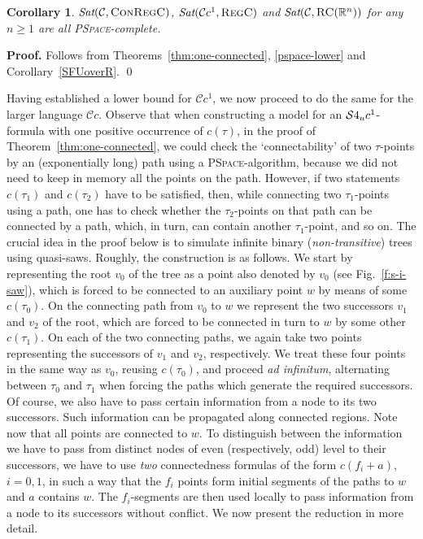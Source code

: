 \documentclass{LMCS}
\renewenvironment{proof}{\par\noindent\textbf{Proof.}}{\mbox{}\qed\par\medskip}
\theoremstyle{plain}
\newtheorem{corollary}[thm]{Corollary}
\newcommand{\cBC}{\ensuremath{\mathcal{C}}}
\newcommand{\cBCc}{\ensuremath{\cBC{}c}} \newcommand{\cBCcc}{\ensuremath{\cBC{}cc}}
\newcommand{\Sat}{\textit{Sat}}
\newcommand{\Regc}{\textsc{RegC}}
\newcommand{\ConR}{\textsc{ConRegC}}
\newcommand{\PSpace}{\textsc{PSpace}}
\begin{document}
\begin{corollary}\label{cor:cBCconPSPACEcomplete}
$\Sat(\cBC,\ConR)$, $\Sat(\cBCc^1,\Regc)$ and $\Sat(\cBC,\RegC(\R^n))$ for any $n\geq 1$ are all \PSpace{}-complete.
\end{corollary}
\begin{proof}
Follows from Theorems~\ref{thm:one-connected}, \ref{pspace-lower} and Corollary~\ref{SFUoverR}.
\end{proof}



Having established a lower bound for $\cBCc{}^1$, we now proceed to do
the same for the larger language $\cBCc$.  Observe that when
constructing a model for an $\mathcal{S}4_u{}c^1$-formula with one positive
occurrence of $c(\tau)$, in the proof of
Theorem~\ref{thm:one-connected}, we could check the `connectability' of two
$\tau$-points by an (exponentially long) path using a
\PSpace{}-algorithm, because we did not need to keep in memory all the
points on the path. However, if two statements $c(\tau_1)$ and
$c(\tau_2)$ have to be satisfied, then, while connecting two
$\tau_1$-points using a path, one has to check whether the
$\tau_2$-points on that path can be connected by a path, which, in
turn, can contain another $\tau_1$-point, and so on.  The crucial idea
in the proof below is to simulate infinite binary
(\emph{non-transitive}) trees using quasi-saws. Roughly, the
construction is as follows.  We start by representing the root $v_{0}$
of the tree as a point also denoted by $v_{0}$ (see
Fig.~\ref{f:s-i-saw}), which is forced to be connected to an auxiliary
point $w$ by means of some $c(\tau_0)$. On the connecting path from
$v_0$ to $w$ we represent the two successors $v_1$ and $v_2$ of the
root, which are forced to be connected in turn to $w$ by some other
$c(\tau_1)$. On each of the two connecting paths, we again take two
points representing the successors of $v_1$ and $v_2$,
respectively. We treat these four points in the same way as $v_0$,
reusing $c(\tau_0)$, and proceed \emph{ad infinitum}, alternating
between $\tau_0$ and $\tau_1$ when forcing the paths which generate
the required successors. Of course, we also have to pass certain
information from a node to its two successors. Such
information can be propagated along connected regions. Note now that
all points are connected to $w$. To distinguish between the
information we have to pass from distinct nodes of even (respectively,
odd) level to their successors, we have to use \emph{two}
connectedness formulas of the form $c(f_i + a)$, $i=0,1$, in such a
way that the $f_i$ points form initial segments of the paths to $w$
and $a$ contains $w$. The $f_i$-segments are then used locally to pass
information from a node to its successors without conflict. We now
present the reduction in more detail.
\end{document}
